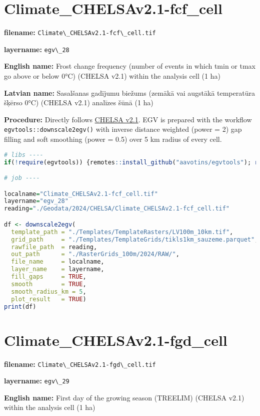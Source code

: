 \documentclass[
]{book}
\newcommand{\passthrough}[1]{#1}
\begin{document}
\section{Climate\_CHELSAv2.1-fcf\_cell}\label{ch06.028}

\textbf{filename:} \passthrough{\lstinline!Climate\_CHELSAv2.1-fcf\_cell.tif!}

\textbf{layername:} \passthrough{\lstinline!egv\_28!}

\textbf{English name:} Frost change frequency (number of events in which tmin or tmax go above or below 0°C) (CHELSA v2.1) within the analysis cell (1 ha)

\textbf{Latvian name:} Sasalšanas gadījumu biežums (zemākā vai augstākā temperatūra šķērso 0°C) (CHELSA v2.1) analīzes šūnā (1 ha)

\textbf{Procedure:} Directly follows \hyperref[Ch04.11]{CHELSA v2.1}. EGV is prepared with the
workflow \passthrough{\lstinline!egvtools::downscale2egv()!} with inverse distance weighted (power = 2)
gap filling and soft smoothing (power = 0.5) over 5 km radius of every cell.

\begin{lstlisting}[language=R]
# libs ----
if(!require(egvtools)) {remotes::install_github("aavotins/egvtools"); require(egvtools)}

# job ----

localname="Climate_CHELSAv2.1-fcf_cell.tif"
layername="egv_28"
reading="./Geodata/2024/CHELSA/Climate_CHELSAv2.1-fcf_cell.tif"

df <- downscale2egv(
  template_path = "./Templates/TemplateRasters/LV100m_10km.tif",
  grid_path     = "./Templates/TemplateGrids/tikls1km_sauzeme.parquet",
  rawfile_path  = reading,
  out_path      = "./RasterGrids_100m/2024/RAW/",
  file_name     = localname,
  layer_name    = layername,
  fill_gaps     = TRUE,
  smooth        = TRUE,
  smooth_radius_km = 5,
  plot_result   = TRUE)
print(df)
\end{lstlisting}

\section{Climate\_CHELSAv2.1-fgd\_cell}\label{ch06.029}

\textbf{filename:} \passthrough{\lstinline!Climate\_CHELSAv2.1-fgd\_cell.tif!}

\textbf{layername:} \passthrough{\lstinline!egv\_29!}

\textbf{English name:} First day of the growing season (TREELIM) (CHELSA v2.1) within the analysis cell (1 ha)
\end{document}
